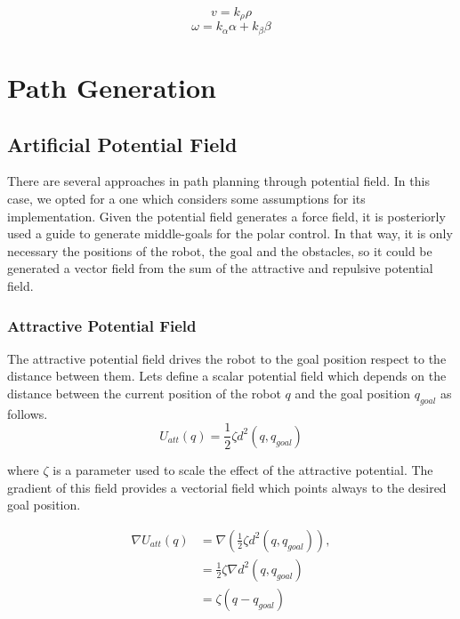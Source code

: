 \documentclass[conference]{IEEEtran}
\begin{document}
\begin{equation}
	v = k_{\rho}\rho
\end{equation}
\begin{equation}
	\omega = k_{\alpha}\alpha + k_{\beta}\beta
\end{equation}


\section{Path Generation}
\label{sec:APF}
\subsection{Artificial Potential Field}
There are several approaches in path planning through potential field. In this case, we opted for a one which considers some assumptions for its implementation. Given the potential field generates a force field, it is posteriorly used a guide to generate middle-goals for the polar control. In that way, it is only necessary the positions of the robot, the goal and the obstacles, so it could be generated a vector field from the sum of the attractive  and repulsive potential field.\\

\subsubsection{\textbf{Attractive Potential Field}}
The attractive potential field drives the robot to the goal position respect to the distance between them. Lets define a scalar potential field which depends on the distance between the current position of the robot $q$ and the goal position $q_{goal}$ as follows. 
\begin{equation}
	U_{att}(q) = \frac{1}{2} \zeta d^2(q,q_{goal})
	\label{eq:pot_attr}
\end{equation}

where  $\zeta$  is a parameter used to scale the effect of the attractive potential. The gradient of this field provides a vectorial field which points always to the desired goal position.

\begin{equation}
	\label{gradient_att}
	\begin{aligned}
		\nabla U_{att}(q) &= \nabla (\frac{1}{2}\zeta d^2 (q,q_{goal})),\\
		&=\frac{1}{2}\zeta \nabla d^2(q,q_{goal})\\
		&= \zeta(q - q_{goal})
	\end{aligned}
\end{equation}
\end{document}
